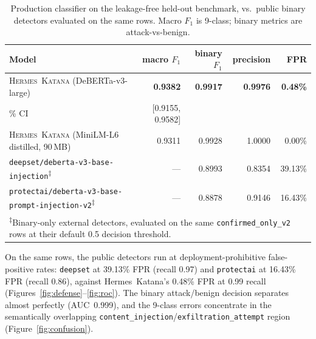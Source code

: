 \documentclass{article}
\newcommand{\katana}{\textsc{Hermes~Katana}}
\begin{document}
\begin{table}[t]
\centering
\small
\caption{Production classifier on the leakage-free held-out benchmark, vs.\ public binary detectors evaluated on the same rows. Macro $F_1$ is 9-class; binary metrics are attack-vs-benign.}
\label{tab:defense}
\begin{tabular}{lrrrr}
\toprule
\textbf{Model} & \textbf{macro $F_1$} & \textbf{binary $F_1$} & \textbf{precision} & \textbf{FPR} \\
\midrule
\katana{} (DeBERTa-v3-large) & \textbf{0.9382} & \textbf{0.9917} & \textbf{0.9976} & \textbf{0.48\%} \\
\quad 95\% CI & [0.9155, 0.9582] & & & \\
\katana{} (MiniLM-L6 distilled, 90\,MB) & 0.9311 & 0.9928 & 1.0000 & 0.00\% \\
\midrule
\texttt{deepset/deberta-v3-base-injection}\textsuperscript{$\ddagger$} & --- & 0.8993 & 0.8354 & 39.13\% \\
\texttt{protectai/deberta-v3-base-prompt-injection-v2}\textsuperscript{$\ddagger$} & --- & 0.8878 & 0.9146 & 16.43\% \\
\bottomrule
\multicolumn{5}{l}{\footnotesize \textsuperscript{$\ddagger$}Binary-only external detectors, evaluated on the same \texttt{confirmed\_only\_v2} rows at their default 0.5 decision threshold.}
\end{tabular}
\end{table}

On the same rows, the public detectors run at deployment-prohibitive false-positive rates: \texttt{deepset} at 39.13\% FPR (recall 0.97) and \texttt{protectai} at 16.43\% FPR (recall 0.86), against Hermes~Katana's 0.48\% FPR at 0.99 recall (Figures~\ref{fig:defense}--\ref{fig:roc}). The binary attack/benign decision separates almost perfectly (AUC~0.999), and the 9-class errors concentrate in the semantically overlapping \texttt{content\_injection}/\texttt{exfiltration\_attempt} region (Figure~\ref{fig:confusion}).


\end{document}
